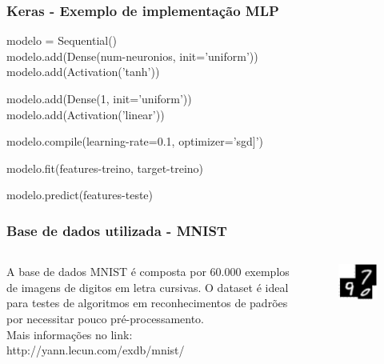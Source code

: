 \documentclass[tikz,11pt]{beamer}
\begin{document}
\begin{frame}
	\frametitle{Keras - Exemplo de implementação MLP}
	
	
	modelo = Sequential() \\
	modelo.add(Dense(num-neuronios, init='uniform'))\\
	modelo.add(Activation('tanh')) \newline
	
	modelo.add(Dense(1, init='uniform')) \\
	modelo.add(Activation('linear')) \newline
	
	modelo.compile(learning-rate=0.1, optimizer='sgd]') \newline
	
	modelo.fit(features-treino, target-treino) \newline
	
	modelo.predict(features-teste)
	
\end{frame} 

\begin{frame}
	\frametitle{Base de dados utilizada - MNIST}
	
	\begin{columns}
		\begin{column}{0.48\textwidth}
			A base de dados MNIST é composta por 60.000 exemplos de
			imagens de digitos em letra cursivas. O dataset é ideal para
			testes de algoritmos em reconhecimentos de padrões por
			necessitar pouco pré-processamento.\\
			Mais informações no link: http://yann.lecun.com/exdb/mnist/
		\end{column}
		\begin{column}{0.48\textwidth}
			\begin{figure}
				\centering
				\includegraphics[scale=0.35]{minst}
			\end{figure}
		\end{column}
	\end{columns}
	
	
\end{frame}
\end{document}
